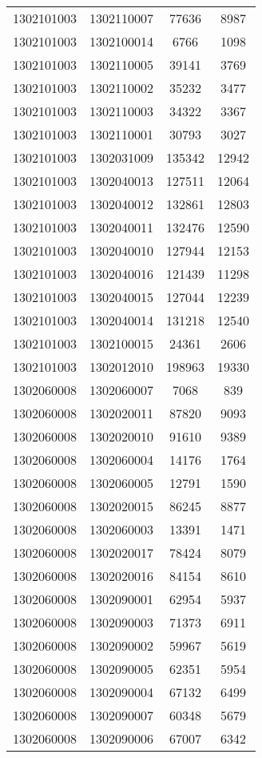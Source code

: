 \begin{longtable}[h]{llcc}
		1302101003 & 1302110007 & 77636 & 8987\\
		1302101003 & 1302100014 & 6766 & 1098\\
		1302101003 & 1302110005 & 39141 & 3769\\
		1302101003 & 1302110002 & 35232 & 3477\\
		1302101003 & 1302110003 & 34322 & 3367\\
		1302101003 & 1302110001 & 30793 & 3027\\
		1302101003 & 1302031009 & 135342 & 12942\\
		1302101003 & 1302040013 & 127511 & 12064\\
		1302101003 & 1302040012 & 132861 & 12803\\
		1302101003 & 1302040011 & 132476 & 12590\\
		1302101003 & 1302040010 & 127944 & 12153\\
		1302101003 & 1302040016 & 121439 & 11298\\
		1302101003 & 1302040015 & 127044 & 12239\\
		1302101003 & 1302040014 & 131218 & 12540\\
		1302101003 & 1302100015 & 24361 & 2606\\
		1302101003 & 1302012010 & 198963 & 19330\\
		1302060008 & 1302060007 & 7068 & 839\\
		1302060008 & 1302020011 & 87820 & 9093\\
		1302060008 & 1302020010 & 91610 & 9389\\
		1302060008 & 1302060004 & 14176 & 1764\\
		1302060008 & 1302060005 & 12791 & 1590\\
		1302060008 & 1302020015 & 86245 & 8877\\
		1302060008 & 1302060003 & 13391 & 1471\\
		1302060008 & 1302020017 & 78424 & 8079\\
		1302060008 & 1302020016 & 84154 & 8610\\
		1302060008 & 1302090001 & 62954 & 5937\\
		1302060008 & 1302090003 & 71373 & 6911\\
		1302060008 & 1302090002 & 59967 & 5619\\
		1302060008 & 1302090005 & 62351 & 5954\\
		1302060008 & 1302090004 & 67132 & 6499\\
		1302060008 & 1302090007 & 60348 & 5679\\
		1302060008 & 1302090006 & 67007 & 6342\\

\end{longtable}
